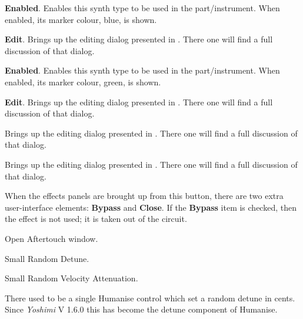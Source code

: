 
   \begin{enumber}
      \item \textbf{Enabled}.
      Enables this synth type to be used in the part/instrument.
      When enabled, its marker colour, blue, is shown.
      \item \textbf{Edit}.
      Brings up the editing dialog presented in
      .
      There one will find a full discussion of that dialog.
   \end{enumber}


   \begin{enumber}
      \item \textbf{Enabled}.
      Enables this synth type to be used in the part/instrument.
      When enabled, its marker colour, green, is shown.
      \item \textbf{Edit}.
      Brings up the editing dialog presented in
      .
      There one will find a full discussion of that dialog.
   \end{enumber}

   Brings up the editing dialog presented in
   .
   There one will find a full discussion of that dialog.

   Brings up the editing dialog presented in
   .
   There one will find a full discussion of that dialog.

   When the effects panels are brought up from this button, there are two extra
   user-interface elements:
   \textbf{Bypass} and \textbf{Close}.
   If the \textbf{Bypass} item is checked, then the effect is not
   used; it is taken out of the circuit.

   Open Aftertouch window.

   Small Random Detune.

   Small Random Velocity Attenuation.

   There used to be a single Humanise control which set a random detune in cents.
   Since \textsl{Yoshimi} V 1.6.0 this has become the detune component of Humanise.

